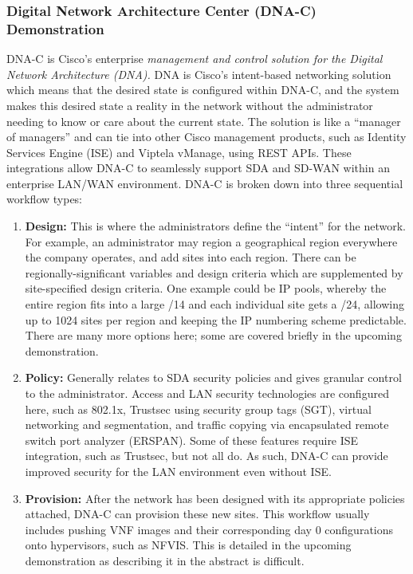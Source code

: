 \subsubsection{Digital Network Architecture Center (DNA-C) Demonstration}
DNA-C is Cisco's enterprise \textit{management and control solution for the Digital
Network Architecture (DNA).} DNA is Cisco's intent-based networking solution
which means that the desired state is configured within DNA-C, and the system
makes this desired state a reality in the network without the administrator
needing to know or care about the current state. The solution is like a
``manager of managers'' and can tie into other Cisco management products, such
as Identity Services Engine (ISE) and Viptela vManage, using REST APIs. These
integrations allow DNA-C to seamlessly support SDA and SD-WAN within an
enterprise LAN/WAN environment. DNA-C is broken down into three sequential
workflow types:

\begin{enumerate}
  \item \textbf{Design:} This is where the administrators define the ``intent'' for the
  network. For example, an administrator may region a geographical region
  everywhere the company operates, and add sites into each region. There can be
  regionally-significant variables and design criteria which are supplemented by
  site-specified design criteria. One example could be IP pools, whereby the
  entire region fits into a large /14 and each individual site gets a /24,
  allowing up to 1024 sites per region and keeping the IP numbering scheme
  predictable. There are many more options here; some are covered briefly in the
  upcoming demonstration.
  \item \textbf{Policy:} Generally relates to SDA security policies and gives granular
  control to the administrator. Access and LAN security technologies are
  configured here, such as 802.1x, Trustsec using security group tags (SGT),
  virtual networking and segmentation, and traffic copying via encapsulated
  remote switch port analyzer (ERSPAN). Some of these features require ISE
  integration, such as Trustsec, but not all do. As such, DNA-C can provide
  improved security for the LAN environment even without ISE.
  \item \textbf{Provision:} After the network has been designed with its appropriate
  policies attached, DNA-C can provision these new sites. This workflow usually
  includes pushing VNF images and their corresponding day 0 configurations onto
  hypervisors, such as NFVIS. This is detailed in the upcoming demonstration as
  describing it in the abstract is difficult.
\end{enumerate}

